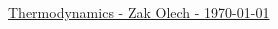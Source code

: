 \documentclass[10pt,landscape]{article}
\begin{document}
\raggedright
\footnotesize

\begin{center}
     \Large{\underline{Thermodynamics - Zak Olech - \today}}
\end{center}
\begin{multicols}{3}

\setlength{\columnseprule}{0.25pt}
\setlength{\premulticols}{1pt}
\setlength{\postmulticols}{1pt}
\setlength{\multicolsep}{1pt}
\setlength{\columnsep}{2pt}

\end{multicols}
\end{document}
